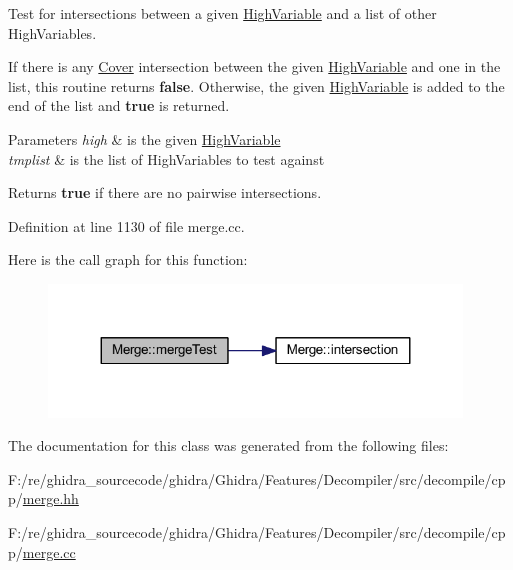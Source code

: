 Test for intersections between a given \mbox{\hyperlink{class_high_variable}{High\+Variable}} and a list of other High\+Variables. 

If there is any \mbox{\hyperlink{class_cover}{Cover}} intersection between the given \mbox{\hyperlink{class_high_variable}{High\+Variable}} and one in the list, this routine returns {\bfseries{false}}. Otherwise, the given \mbox{\hyperlink{class_high_variable}{High\+Variable}} is added to the end of the list and {\bfseries{true}} is returned. 
\begin{DoxyParams}{Parameters}
{\em high} & is the given \mbox{\hyperlink{class_high_variable}{High\+Variable}} \\
\hline
{\em tmplist} & is the list of High\+Variables to test against \\
\hline
\end{DoxyParams}
\begin{DoxyReturn}{Returns}
{\bfseries{true}} if there are no pairwise intersections. 
\end{DoxyReturn}


Definition at line 1130 of file merge.\+cc.

Here is the call graph for this function\+:
\nopagebreak
\begin{figure}[H]
\begin{center}
\leavevmode
\includegraphics[width=311pt]{class_merge_a819c900aaa428a745faa59335bf0b69e_cgraph}
\end{center}
\end{figure}


The documentation for this class was generated from the following files\+:\begin{DoxyCompactItemize}
\item 
F\+:/re/ghidra\+\_\+sourcecode/ghidra/\+Ghidra/\+Features/\+Decompiler/src/decompile/cpp/\mbox{\hyperlink{merge_8hh}{merge.\+hh}}\item 
F\+:/re/ghidra\+\_\+sourcecode/ghidra/\+Ghidra/\+Features/\+Decompiler/src/decompile/cpp/\mbox{\hyperlink{merge_8cc}{merge.\+cc}}\end{DoxyCompactItemize}
